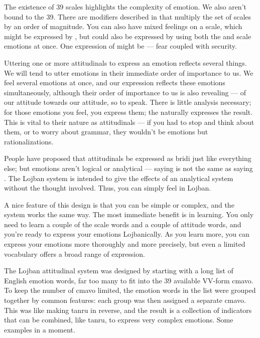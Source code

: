 The existence of 39 scales highlights the complexity of
    emotion. We also aren't bound to the 39. There are modifiers
    described in  that multiply the set
    of scales by an order of magnitude. You can also have mixed
    feelings on a scale, which might be expressed by , but
    could also be expressed by using both the  and
     scale emotions at once. One expression of
     might be  --- fear coupled with
    security.

Uttering one or more attitudinals to express an emotion
    reflects several things. We will tend to utter emotions in
    their immediate order of importance to us. We feel several
    emotions at once, and our expression reflects these emotions
    simultaneously, although their order of importance to us is
    also revealing --- of our attitude towards our attitude, so to
    speak. There is little analysis necessary; for those emotions
    you feel, you express them; the  naturally
    expresses the result. This is vital to their nature as
    attitudinals --- if you had to stop and think about them, or to
    worry about grammar, they wouldn't be emotions but
    rationalizations.

People have proposed that attitudinals be expressed as bridi
    just like everything else; but emotions aren't logical or
    analytical --- saying  is not the same as saying
    . The Lojban system is intended to give the effects
    of an analytical system without the thought involved. Thus, you
    can simply feel in Lojban.

A nice feature of this design is that you can be simple or
    complex, and the system works the same way. The most immediate
    benefit is in learning. You only need to learn a couple of the
    scale words and a couple of attitude words, and you're ready to
    express your emotions Lojbanically. As you learn more, you can
    express your emotions more thoroughly and more precisely, but
    even a limited vocabulary offers a broad range of
    expression.



The Lojban attitudinal system was designed by starting with
    a long list of English emotion words, far too many to fit into
    the 39 available VV-form cmavo. To keep the number of cmavo
    limited, the emotion words in the list were grouped together by
    common features: each group was then assigned a separate cmavo.
    This was like making tanru in reverse, and the result is a
    collection of indicators that can be combined, like tanru, to
    express very complex emotions. Some examples in a moment.

